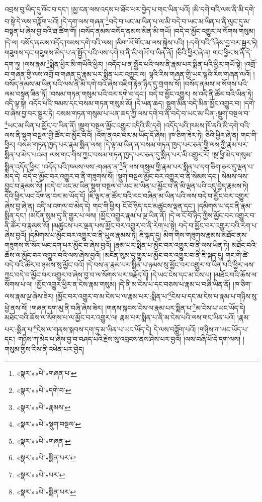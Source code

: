 འབྲས་བུ་ཡིད་དུ་འོང་བ་དང་། །མྱ་ངན་ལས་འདས་པ་ཐོབ་པར་བྱེད་པ་གང་ཡིན་པའོ། །མི་དགེ་བའི་ལས་ནི་མི་དགེ་བ་སྟེ་དེ་ལས་བཟློག་པའོ། །དེ་དག་ལས་གཞན་\footnote{«སྣར་»«པེ་»གཞན་པ་}བདེ་བ་ཡང་མ་ཡིན་པ་ལ་མི་བདེ་བ་ཡང་མ་ཡིན་པ་ནི་ལུང་དུ་མ་བསྟན་པ་ཞེས་བྱ་བའི་ཐ་ཚིག་གོ། །བསོད་ནམས་བསོད་ནམས་མིན་མི་གཡོ། །བདེ་བ་མྱོང་འགྱུར་ལ་སོགས་གསུམ། །དེ་ལ། བསོད་ནམས་འདོད་ཁམས་དགེ་བའི་ལས། །མིག་ཡོ་གོང་མ་ལས་སྐྱེས་པའི། །:དགེ་བའི་\footnote{«སྣར་»«པེ་»དགེ་བ་}ཞེས་བྱ་བར་སྦྱར་ཏེ། གཟུགས་དང་གཟུགས་མེད་པ་ན་སྤྱོད་པའི་ལས་དགེ་བ་ནི་མི་གཡོ་བ་ཡིན་ནོ། །ཅིའི་ཕྱིར་ཞེ་ན། གང་ཕྱིར་ས་ནི་དེ་དག་ཏུ། །ལས་རྣམ་\footnote{«སྣར་»«པེ་»རྣམས་}སྨིན་ཕྱིར་མི་གཡོའི་ཕྱིར། །འདོད་པ་ན་སྤྱོད་པའི་ལས་ནི་རྣམ་པར་སྨིན་པའི་ཕྱིར་གཡོ་སྟེ། །འགྲོ་བ་གཞན་གྱི་ལས་འགྲོ་བ་གཞན་དུ་རྣམ་པར་སྨིན་པར་འགྱུར་ལ། ལྷའི་རིས་གཞན་གྱི་ཡང་ལྷའི་རིས་གཞན་ལའོ། །བསོད་ནམས་མ་ཡིན་པའི་ལས་ནི་མི་དགེ་བའོ་ཞེས་འཇིག་རྟེན་ཉིད་དུ་གྲགས་སོ། །བསོད་ནམས་ལ་སོགས་པའི་ལམ་བསྟན་ཟིན་ཏོ། །བསམ་གཏན་གསུམ་པའི་བར་དགེ་བ་དང་། བདེ་བ་མྱོང་འགྱུར། ས་འདི་ནི་ཚོར་བའི་ཡིན་ཏེ། འདི་ལྟ་སྟེ། འདོད་པའི་ཁམས་དང་བསམ་གཏན་གསུམ་མོ། །དེ་ཡན་ཆད། སྡུག་མིན་བདེ་མིན་མྱོང་འགྱུར་བ། །དགེ་བ་ཞེས་བྱ་བར་སྦྱར་ཏེ། བསམ་གཏན་གསུམ་པ་ཡན་ཆད་ཀྱི་ལས་དགེ་བ་ནི་བདེ་བ་ཡང་མ་ཡིན་:སྡུག་བསྔལ་བ་\footnote{«སྣར་»«པེ་»སྡུག་བསྔལ་}ཡང་མ་ཡིན་པ་མྱོང་བ་ཡིན་ནོ། །སྡུག་བསྔལ་མྱོང་འགྱུར་འདིའི་མི་དགེ །འདོད་པའི་ཁམས་ཁོ་ནའི་མི་དགེ་བའི་ལས་ནི་སྡུག་བསྔལ་གྱི་ཚོར་བ་མྱོང་བའོ། །འོག་ནའང་བར་མ་ཡོད་དོ་ཞེས། །ཁ་ཅིག་ཟེར་ཏེ། ཅིའི་ཕྱིར་ཞེ་ན། གང་གི་ཕྱིར། བསམ་གཏན་ཁྱད་པར་རྣམ་སྨིན་ལས། །དེ་ལྟ་མ་ཡིན་ན་བསམ་གཏན་ཁྱད་པར་ཅན་གྱི་ལས་ཀྱི་རྣམ་པར་སྨིན་པ་མེད་པའམ། ལས་གང་གིས་ཀྱང་བསམ་གཏན་ཁྱད་པར་ཅན་དུ་སྨིན་པར་མི་འགྱུར་རོ། །སྔ་ཕྱི་མེད་གསུམ་སྨིན་འདོད་ཕྱིར། །འདོད་པའི་ཁམས་ལས་:གཞན་ན་\footnote{«སྣར་»«པེ་»གཞན་}ནི་ལས་གསུམ་གྱི་རྣམ་པར་སྨིན་པ་དག་ཅིག་ཅར་དུ་ལྡན་པ་མེད་དེ། བདེ་བ་མྱོང་བར་འགྱུར་བ་ནི་གཟུགས་སོ། །སྡུག་བསྔལ་མྱོང་བར་འགྱུར་བ་ནི་སེམས་དང་། སེམས་ལས་བྱུང་བ་རྣམས་སོ། །བདེ་བ་ཡང་མ་ཡིན་སྡུག་བསྔལ་བ་ཡང་མ་ཡིན་པ་མྱོང་བ་ནི་མི་ལྡན་པའི་འདུ་བྱེད་རྣམས་ཏེ། དེའི་ཕྱིར་ཡང་འོག་ན་བར་མ་ཡོད་དོ། །ཇི་ལྟར་ན་ཚོར་བའི་རང་བཞིན་མ་ཡིན་པའི་ལས་བདེ་བ་མྱོང་བར་འགྱུར་ཞེས་བྱ་ཞེ་ན། འདི་ལ་འགལ་བ་མེད་དེ། གང་གི་ཕྱིར། ངོ་བོ་ཉིད་དང་མཚུངས་ལྡན་དང་། །དམིགས་པ་དང་ནི་རྣམ་སྨིན་དང་། །མངོན་སུམ་དུ་ནི་གྱུར་པ་ལས། །མྱོང་འགྱུར་རྣམ་པ་ལྔ་ཡིན་ནོ། །དེ་ལ་ངོ་བོ་ཉིད་ཀྱིས་མྱོང་བར་འགྱུར་བ་ནི་ཚོར་བ་རྣམས་སོ། །མཚུངས་པར་ལྡན་པས་མྱོང་བར་འགྱུར་བ་ནི་རེག་པ་སྟེ། བདེ་བ་མྱོང་བར་འགྱུར་བའི་རེག་པ་ཞེས་བྱའོ། །དམིགས་པ་མྱོང་བར་འགྱུར་བ་ནི་ཡུལ་རྣམས་ཏེ། ཇི་སྐད་དུ། མིག་གིས་གཟུགས་རྣམས་མཐོང་ནས་གཟུགས་སོ་སོར་ཡང་དག་པར་མྱོང་བ་ཞེས་བྱའོ། །རྣམ་པར་སྨིན་པ་མྱོང་བར་འགྱུར་བ་ནི་ལས་ཡིན་ཏེ། མཐོང་བའི་ཆོས་ལ་མྱོང་བར་འགྱུར་བའི་ལས་ཞེས་བྱའོ། །མངོན་སུམ་དུ་གྱུར་པ་མྱོང་བར་འགྱུར་བ་ནི་ཇི་སྐད་དུ། གང་གི་ཚེ་བདེ་བའི་ཚོར་བ་ཉམས་སུ་མྱོང་བའོ། །དེ་བས་ན་རྣམ་པར་སྨིན་པ་ཉམས་སུ་མྱོང་བར་འགྱུར་བ་ཡིན་པའི་ཕྱིར་ལས་ཀྱང་བདེ་བ་མྱོང་བར་འགྱུར་བ་ཞེས་བྱ་བ་ལ་སོགས་པར་བརྗོད་དོ། །དེ་ཡང་ངེས་དང་མ་ངེས་པ། །མཐོང་བའི་ཆོས་ལ་སོགས་པ་ལ། །མྱོང་འགྱུར་ཕྱིར་ན་ངེས་རྣམ་གསུམ། །དེ་ནི་མ་ངེས་པ་དང་བཅས་པ་རྣམ་པ་བཞི་ཡིན་ནོ། །ཁ་ཅིག་ལས་རྣམ་ལྔ་ཞེས་ཟེར། །མྱོང་བར་འགྱུར་བ་མ་ངེས་པ་ལ་རྣམ་པར་:སྨིན་པ་\footnote{«སྣར་»«པེ་»སྨིན་པར་}ངེས་པ་དང་མ་ངེས་པ་རྣམ་པ་གཉིས་སུ་ཕྱེ་ནས་སོ། །གཞན་དག་མུ་ནི་བཞི་ཞེས་ཟེར། །གནས་སྐབས་ངེས་ལ་རྣམ་པར་སྨིན་པ་\footnote{«སྣར་»«པེ་»པར་}མ་ངེས་པ་ཡང་ཡོད་དེ། མཐོང་བའི་ཆོས་ལ་སོགས་པ་ལ་མྱོང་བར་འགྱུར་ལ། རྣམ་པར་སྨིན་པ་ནི་མ་ངེས་པའི་ལས་གང་ཡིན་པའོ། །རྣམ་པར་:སྨིན་པ་\footnote{«སྣར་»«པེ་»སྨིན་པར་}ངེས་ལ་གནས་སྐབས་དག་ཏུ་མ་ཡིན་པ་ཡང་ཡོད་དེ། དེ་ལས་བཟློག་པའོ། །གཉིས་ཀ་ཡང་ཡོད་པ་དང་། གཉིས་ཀ་མེད་པ་ཞེས་བྱ་བ་བཤད་པའི་རྗེས་སུ་འབྲངས་ནས་ཤེས་པར་བྱའོ། །ལས་བཞི་པོ་དེ་དག་ལས། །གསུམ་གྱིས་རིས་ནི་འཕེན་པར་བྱེད། 
